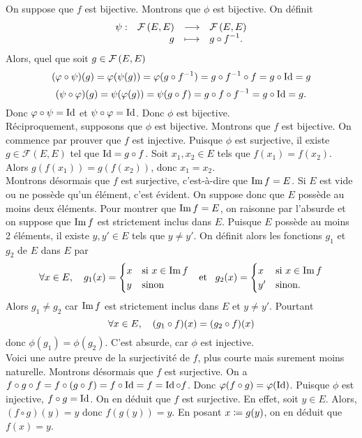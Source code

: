 \documentclass{magnolia}
\begin{document}
\begin{sol}
On suppose que $f$ est bijective. Montrons que $\phi$ est bijective. On définit
\[\begin{array}[t]{lrcl} \displaystyle{\psi} : & \displaystyle{\mathcal{F}\left(E,E\right)} & \longrightarrow & \displaystyle{\mathcal{F}\left(E,E\right)} \\ & \displaystyle{g} & \longmapsto & \displaystyle{g\circ f^{-1}.} \end{array}\]
Alors, quel que soit $g\in\mathcal{F}\left(E,E\right)$
\[(\varphi\circ\psi)(g)=\varphi(\psi(g))=\varphi(g\circ f^{-1})=g\circ f^{-1}\circ f=g\circ\operatorname{Id}=g\]
\[(\psi\circ\varphi)(g)=\psi(\varphi(g))=\psi(g\circ f)=g\circ f\circ f^{-1}=g\circ\operatorname{Id}=g.\]
Donc $\varphi\circ\psi=\operatorname{Id}$ et $\psi\circ\varphi=\operatorname{Id}$. Donc $\phi$ est bijective.\\

Réciproquement, supposons que $\phi$ est bijective. Montrons que $f$ est bijective. On commence par prouver que $f$ est injective. Puisque $\phi$ est surjective, il existe $g\in\mathcal{F}(E,E)$ tel que $\operatorname{Id}=g\circ f$. Soit $x_1,x_2\in E$ tels que $f(x_1)=f(x_2)$. Alors $g(f(x_1))=g(f(x_2))$, donc $x_1=x_2$.\\
Montrons désormais que $f$ est surjective, c'est-à-dire que $\operatorname{Im} f=E$. Si $E$ est vide ou ne possède qu'un élément, c'est évident. On suppose donc que $E$ possède au moins deux éléments. Pour montrer que $\operatorname{Im} f=E$, on raisonne par l'absurde et on suppose que $\operatorname{Im} f$ est strictement inclus dans $E$. Puisque $E$ possède au moins 2 éléments, il existe $y,y'\in E$ tels que $y\neq y'$. On définit alors les fonctions $g_1$ et $g_2$ de $E$ dans $E$ par
\[\forall x\in E,\quad g_1(x)=\begin{cases}
x &\text{si $x\in\operatorname{Im} f$}\\
y &\text{sinon}
\end{cases} \quad\!\text{et}\quad\!
g_2(x)=\begin{cases}
x &\text{si $x\in\operatorname{Im} f$}\\
y' &\text{sinon.}
\end{cases}
\]
Alors $g_1\neq g_2$ car $\operatorname{Im} f$ est strictement inclus dans $E$ et $y\neq y'$. Pourtant
\[\forall x\in E,\quad (g_1\circ f)(x)=(g_2\circ f)(x)\]
donc $\phi(g_1)=\phi(g_2)$. C'est absurde, car $\phi$ est injective.\\
Voici une autre preuve de la surjectivité de $f$, plus courte mais surement moins naturelle.
Montrons désormais que $f$ est surjective. On a $f\circ g\circ f=f\circ(g\circ f)=f\circ\operatorname{Id}=f=\operatorname{Id}\circ f$. Donc $\varphi(f\circ g)=\varphi(\operatorname{Id})$. Puisque $\phi$ est injective, $f\circ g=\operatorname{Id}$. On en déduit que $f$ est surjective. En effet, soit $y\in E$. Alors, $(f\circ g)(y)=y$ donc $f(g(y))=y$. En posant $x\coloneqq g(y)$, on en déduit que $f(x)=y$.\\
\end{sol}
\end{document}
